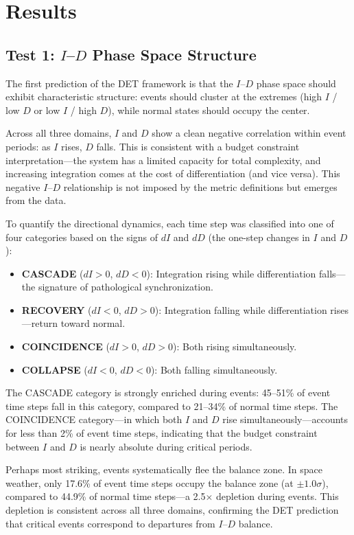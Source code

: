 \documentclass[aip,cha,reprint,amsmath,amssymb]{revtex4-2}
\begin{document}
\section{Results}

\subsection{Test 1: $I$--$D$ Phase Space Structure}

The first prediction of the DET framework is that the $I$--$D$ phase space should exhibit characteristic structure: events should cluster at the extremes (high $I$ / low $D$ or low $I$ / high $D$), while normal states should occupy the center.

Across all three domains, $I$ and $D$ show a clean negative correlation within event periods: as $I$ rises, $D$ falls. This is consistent with a budget constraint interpretation---the system has a limited capacity for total complexity, and increasing integration comes at the cost of differentiation (and vice versa). This negative $I$--$D$ relationship is not imposed by the metric definitions but emerges from the data.

To quantify the directional dynamics, each time step was classified into one of four categories based on the signs of $dI$ and $dD$ (the one-step changes in $I$ and $D$):

\begin{itemize}
\item \textbf{CASCADE} ($dI > 0$, $dD < 0$): Integration rising while differentiation falls---the signature of pathological synchronization.
\item \textbf{RECOVERY} ($dI < 0$, $dD > 0$): Integration falling while differentiation rises---return toward normal.
\item \textbf{COINCIDENCE} ($dI > 0$, $dD > 0$): Both rising simultaneously.
\item \textbf{COLLAPSE} ($dI < 0$, $dD < 0$): Both falling simultaneously.
\end{itemize}

The CASCADE category is strongly enriched during events: 45--51\% of event time steps fall in this category, compared to 21--34\% of normal time steps. The COINCIDENCE category---in which both $I$ and $D$ rise simultaneously---accounts for less than 2\% of event time steps, indicating that the budget constraint between $I$ and $D$ is nearly absolute during critical periods.

Perhaps most striking, events systematically flee the balance zone. In space weather, only 17.6\% of event time steps occupy the balance zone (at $\pm 1.0\sigma$), compared to 44.9\% of normal time steps---a 2.5$\times$ depletion during events. This depletion is consistent across all three domains, confirming the DET prediction that critical events correspond to departures from $I$--$D$ balance.
\end{document}
